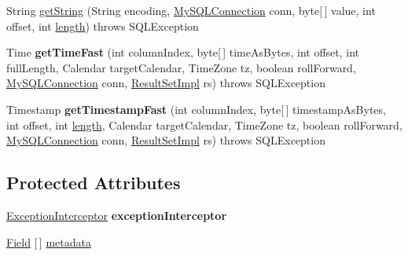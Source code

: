 \begin{DoxyCompactItemize}
\item 
String \mbox{\hyperlink{classcom_1_1mysql_1_1jdbc_1_1_result_set_row_a00bcc93b466d809a12b1e12be8747505}{get\+String}} (String encoding, \mbox{\hyperlink{interfacecom_1_1mysql_1_1jdbc_1_1_my_s_q_l_connection}{My\+S\+Q\+L\+Connection}} conn, byte\mbox{[}$\,$\mbox{]} value, int offset, int \mbox{\hyperlink{classcom_1_1mysql_1_1jdbc_1_1_result_set_row_a7d2e1a3d54533e0655afdc0a411808ed}{length}})  throws S\+Q\+L\+Exception 
\item 
\mbox{\label{classcom_1_1mysql_1_1jdbc_1_1_result_set_row_a8bcb25cbd32a5e721e6e6ac17309e65f}} 
Time {\bfseries get\+Time\+Fast} (int column\+Index, byte\mbox{[}$\,$\mbox{]} time\+As\+Bytes, int offset, int full\+Length, Calendar target\+Calendar, Time\+Zone tz, boolean roll\+Forward, \mbox{\hyperlink{interfacecom_1_1mysql_1_1jdbc_1_1_my_s_q_l_connection}{My\+S\+Q\+L\+Connection}} conn, \mbox{\hyperlink{classcom_1_1mysql_1_1jdbc_1_1_result_set_impl}{Result\+Set\+Impl}} rs)  throws S\+Q\+L\+Exception 
\item 
\mbox{\label{classcom_1_1mysql_1_1jdbc_1_1_result_set_row_a4c850cf70e2d53fb4dfb36ec113feab4}} 
Timestamp {\bfseries get\+Timestamp\+Fast} (int column\+Index, byte\mbox{[}$\,$\mbox{]} timestamp\+As\+Bytes, int offset, int \mbox{\hyperlink{classcom_1_1mysql_1_1jdbc_1_1_result_set_row_a7d2e1a3d54533e0655afdc0a411808ed}{length}}, Calendar target\+Calendar, Time\+Zone tz, boolean roll\+Forward, \mbox{\hyperlink{interfacecom_1_1mysql_1_1jdbc_1_1_my_s_q_l_connection}{My\+S\+Q\+L\+Connection}} conn, \mbox{\hyperlink{classcom_1_1mysql_1_1jdbc_1_1_result_set_impl}{Result\+Set\+Impl}} rs)  throws S\+Q\+L\+Exception 
\end{DoxyCompactItemize}
\subsection*{Protected Attributes}
\begin{DoxyCompactItemize}
\item 
\mbox{\label{classcom_1_1mysql_1_1jdbc_1_1_result_set_row_a946515538dce5f386c0d71d2ce7112da}} 
\mbox{\hyperlink{interfacecom_1_1mysql_1_1jdbc_1_1_exception_interceptor}{Exception\+Interceptor}} {\bfseries exception\+Interceptor}
\item 
\mbox{\hyperlink{classcom_1_1mysql_1_1jdbc_1_1_field}{Field}} \mbox{[}$\,$\mbox{]} \mbox{\hyperlink{classcom_1_1mysql_1_1jdbc_1_1_result_set_row_ac63878ed59cf731b0f02ae12e80e27c0}{metadata}}
\end{DoxyCompactItemize}


